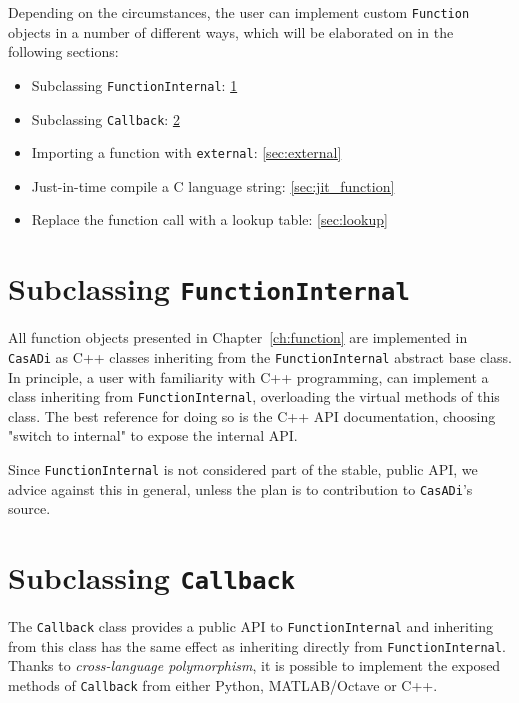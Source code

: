 \documentclass[a4paper,12pt]{book}
\newcommand{\CasADi}{\texttt{CasADi}\xspace}
\begin{document}
Depending on the circumstances, the user can implement custom \texttt{Function}
objects in a number of different ways, which will be elaborated on in the following sections:

\begin{itemize}
\item Subclassing \texttt{FunctionInternal}: \ref{sec:function_internal}
\item Subclassing \texttt{Callback}: \ref{sec:callback}
\item Importing a function with \texttt{external}: \ref{sec:external}
\item Just-in-time compile a C language string: \ref{sec:jit_function}
\item Replace the function call with a lookup table: \ref{sec:lookup}
\end{itemize}

\section{Subclassing \texttt{FunctionInternal}} \label{sec:function_internal}
All function objects presented in Chapter~\ref{ch:function} are implemented
in \CasADi as C++ classes inheriting from the \texttt{FunctionInternal} abstract
base class. In principle, a user with familiarity with C++ programming, can
implement a class inheriting from \texttt{FunctionInternal},
overloading the virtual methods of this class. The best reference for doing so
is the C++ API documentation, choosing "switch to internal" to expose the internal
API.

Since \texttt{FunctionInternal} is not considered part of the stable, public API,
we advice against this in general, unless the plan is to contribution to \CasADi's
source.

\section{Subclassing \texttt{Callback}} \label{sec:callback}
The \texttt{Callback} class provides a public API to \texttt{FunctionInternal}
and inheriting from this class has the same effect as inheriting directly from
\texttt{FunctionInternal}. Thanks to \emph{cross-language polymorphism}, it
is possible to implement the exposed methods of \texttt{Callback} from either
Python, MATLAB/Octave or C++.
\end{document}
